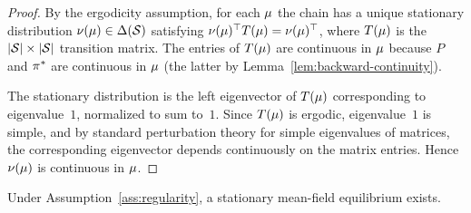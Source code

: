 \documentclass[11pt,a4paper]{article}
\begin{document}
\begin{proof}
By the ergodicity assumption, for each $\mu$ the chain has a
unique stationary distribution $\nu(\mu) \in \Delta(\mathcal{S})$
satisfying $\nu(\mu)^\top T(\mu) = \nu(\mu)^\top$,
where $T(\mu)$ is the $|\mathcal{S}| \times |\mathcal{S}|$ transition
matrix.  The entries of $T(\mu)$ are continuous in $\mu$
because $P$ and $\pi^*$ are continuous in $\mu$ (the
latter by Lemma~\ref{lem:backward-continuity}).

The stationary distribution is the left eigenvector of
$T(\mu)$ corresponding to eigenvalue~$1$, normalized to sum
to~$1$.  Since $T(\mu)$ is ergodic, eigenvalue~$1$ is simple,
and by standard perturbation theory for simple eigenvalues of
matrices, the corresponding eigenvector depends continuously on
the matrix entries.  Hence $\nu(\mu)$ is continuous in
$\mu$.
\end{proof}

\begin{theorem}
\label{thm:existence}
Under Assumption~\ref{ass:regularity}, a stationary mean-field
equilibrium exists.
\end{theorem}
\end{document}
